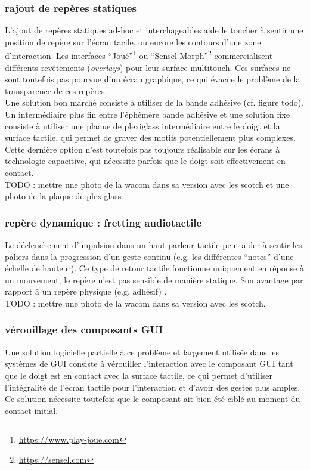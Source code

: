 \subsubsection{rajout de repères statiques}
L'ajout de repères statiques ad-hoc et interchageables aide le toucher à sentir une position de repère sur l'écran tacile, ou encore les contours d'une zone d'interaction. Les interfaces ``Joué''\footnote{\url{https://www.play-joue.com}} ou ``Sensel Morph''\footnote{\url{https://sensel.com}} commercialisent différents revêtements (\textit{overlays}) pour leur surface multitouch. Ces surfaces ne sont toutefois pas pourvue d'un écran graphique, ce qui évacue le problème de la transparence de ces repères.\\
Une solution bon marché consiste à utiliser de la bande adhésive (cf. figure todo). Un intermédiaire plus fin entre l'éphémère bande adhésive et une solution fixe consiste à utiliser une plaque de plexiglass intermédiaire entre le doigt et la surface tactile, qui permet de graver des motifs potentiellement plus complexes. Cette dernière option n'est toutefois pas toujours réalisable sur les écrans à technologie capacitive, qui nécessite parfois que le doigt soit effectivement en contact.\\


TODO : mettre une photo de la wacom dans sa version avec les scotch et une photo de la plaque de plexiglass


\subsubsection{repère dynamique : fretting audiotactile}
Le déclenchement d'impulsion dans un haut-parleur tactile peut aider à sentir les paliers dans la progression d'un geste continu (e.g. les différentes ``notes'' d'une échelle de hauteur). Ce type de retour tactile fonctionne uniquement en réponse à un mouvement, le repère n'est pas sensible de manière statique. Son avantage par rapport à un repère physique (e.g. adhésif) .\\
TODO : mettre une photo de la wacom dans sa version avec les scotch.

\subsubsection{vérouillage des composants GUI}
Une solution logicielle partielle à ce problème et largement utilisée dans les systèmes de GUI consiste à vérouiller l'interaction avec le composant GUI tant que le doigt est en contact avec la surface tactile, ce qui permet d'utiliser l'intégralité de l'écran tactile pour l'interaction et d'avoir des gestes plus amples. Ce solution nécessite toutefois que le composant ait bien été ciblé au moment du contact initial.


